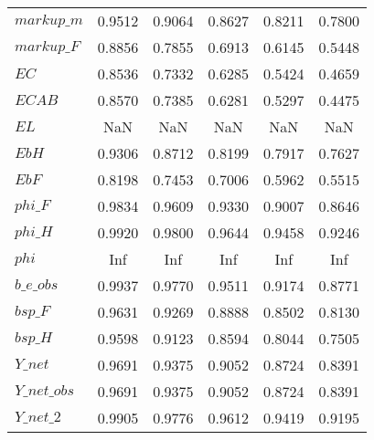 \begin{center}
\begin{longtable}{lccccc}
$markup\_m                  $	 & 	        0.9512	 & 	        0.9064	 & 	        0.8627	 & 	        0.8211	 & 	        0.7800 \\ 
$markup\_F                  $	 & 	        0.8856	 & 	        0.7855	 & 	        0.6913	 & 	        0.6145	 & 	        0.5448 \\ 
$EC                         $	 & 	        0.8536	 & 	        0.7332	 & 	        0.6285	 & 	        0.5424	 & 	        0.4659 \\ 
$ECAB                       $	 & 	        0.8570	 & 	        0.7385	 & 	        0.6281	 & 	        0.5297	 & 	        0.4475 \\ 
$EL                         $	 & 	           NaN	 & 	           NaN	 & 	           NaN	 & 	           NaN	 & 	           NaN \\ 
$EbH                        $	 & 	        0.9306	 & 	        0.8712	 & 	        0.8199	 & 	        0.7917	 & 	        0.7627 \\ 
$EbF                        $	 & 	        0.8198	 & 	        0.7453	 & 	        0.7006	 & 	        0.5962	 & 	        0.5515 \\ 
$phi\_F                     $	 & 	        0.9834	 & 	        0.9609	 & 	        0.9330	 & 	        0.9007	 & 	        0.8646 \\ 
$phi\_H                     $	 & 	        0.9920	 & 	        0.9800	 & 	        0.9644	 & 	        0.9458	 & 	        0.9246 \\ 
$phi                        $	 & 	           Inf	 & 	           Inf	 & 	           Inf	 & 	           Inf	 & 	           Inf \\ 
$b\_e\_obs                  $	 & 	        0.9937	 & 	        0.9770	 & 	        0.9511	 & 	        0.9174	 & 	        0.8771 \\ 
$bsp\_F                     $	 & 	        0.9631	 & 	        0.9269	 & 	        0.8888	 & 	        0.8502	 & 	        0.8130 \\ 
$bsp\_H                     $	 & 	        0.9598	 & 	        0.9123	 & 	        0.8594	 & 	        0.8044	 & 	        0.7505 \\ 
$Y\_net                     $	 & 	        0.9691	 & 	        0.9375	 & 	        0.9052	 & 	        0.8724	 & 	        0.8391 \\ 
$Y\_net\_obs                $	 & 	        0.9691	 & 	        0.9375	 & 	        0.9052	 & 	        0.8724	 & 	        0.8391 \\ 
$Y\_net\_2                  $	 & 	        0.9905	 & 	        0.9776	 & 	        0.9612	 & 	        0.9419	 & 	        0.9195 \\ 

\end{longtable}
\end{center}
